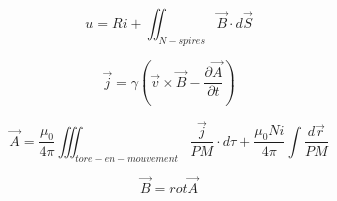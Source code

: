\documentclass[paper=a4]{scrartcl}
\begin{document}
\begin{equation}
	u = Ri + \iint_{N-spires} \vec{B} \cdot d\vec{S}
	\label{u}
\end{equation}

\begin{equation}
	\vec{j} = \gamma \left(
		\vec{v} \times \vec{B} - \frac{\partial\vec{A}}{\partial t}
		\right)
	\label{j}
\end{equation}

\begin{equation}
	\vec{A} = \frac{\mu_0}{4\pi} \iiint_{tore-en-mouvement} \frac{\vec{j}}{PM}
		\cdot d\tau + \frac{\mu_0 Ni}{4\pi} \int\frac{d\vec{r}}{PM}
	\label{A}
\end{equation}

\begin{equation}
	\vec{B} = rot\vec{A}
	\label{B}
\end{equation}
\end{document}
